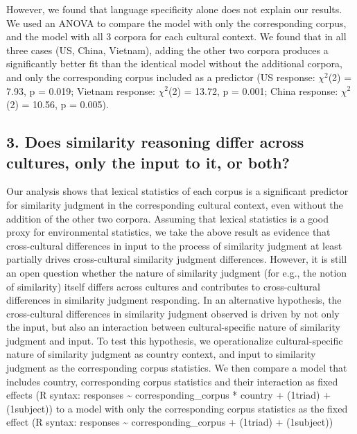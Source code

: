 \documentclass[10pt, letterpaper]{article}
\begin{document}
However, we found that language specificity alone does not explain our
results. We used an ANOVA to compare the model with only the
corresponding corpus, and the model with all 3 corpora for each cultural
context. We found that in all three cases (US, China, Vietnam), adding
the other two corpora produces a significantly better fit than the
identical model without the additional corpora, and only the
corresponding corpus included as a predictor (US response: \(\chi^2\)(2)
= 7.93, p = 0.019; Vietnam response: \(\chi^2\)(2) = 13.72, p = 0.001;
China response: \(\chi^2\)(2) = 10.56, p = 0.005).

\hypertarget{does-similarity-reasoning-differ-across-cultures-only-the-input-to-it-or-both}{%
\subsection{3. Does similarity reasoning differ across cultures, only
the input to it, or
both?}\label{does-similarity-reasoning-differ-across-cultures-only-the-input-to-it-or-both}}

Our analysis shows that lexical statistics of each corpus is a
significant predictor for similarity judgment in the corresponding
cultural context, even without the addition of the other two corpora.
Assuming that lexical statistics is a good proxy for environmental
statistics, we take the above result as evidence that cross-cultural
differences in input to the process of similarity judgment at least
partially drives cross-cultural similarity judgment differences.
However, it is still an open question whether the nature of similarity
judgment (for e.g., the notion of similarity) itself differs across
cultures and contributes to cross-cultural differences in similarity
judgment responding. In an alternative hypothesis, the cross-cultural
differences in similarity judgment observed is driven by not only the
input, but also an interaction between cultural-specific nature of
similarity judgment and input. To test this hypothesis, we
operationalize cultural-specific nature of similarity judgment as
country context, and input to similarity judgment as the corresponding
corpus statistics. We then compare a model that includes country,
corresponding corpus statistics and their interaction as fixed effects
(R syntax: responses \textasciitilde{} corresponding\_corpus * country +
(1\textbar triad) + (1\textbar subject)) to a model with only the
corresponding corpus statistics as the fixed effect (R syntax: responses
\textasciitilde{} corresponding\_corpus + (1\textbar triad) +
(1\textbar subject))
\end{document}
